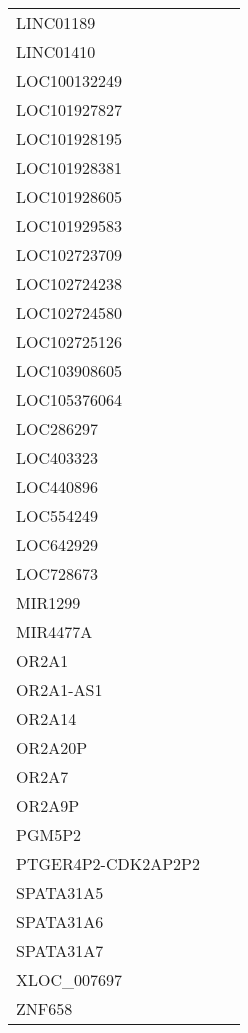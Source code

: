 \begin{tabular}{lcc}
LINC01189          &    &         \\
LINC01410          &    &         \\
LOC100132249       &    &         \\
LOC101927827       &    &         \\
LOC101928195       &    &         \\
LOC101928381       &    &         \\
LOC101928605       &    &         \\
LOC101929583       &    &         \\
LOC102723709       &    &         \\
LOC102724238       &    &         \\
LOC102724580       &    &         \\
LOC102725126       &    &         \\
LOC103908605       &    &         \\
LOC105376064       &    &         \\
LOC286297          &    &         \\
LOC403323          &    &         \\
LOC440896          &    &         \\
LOC554249          &    &         \\
LOC642929          &    &         \\
LOC728673          &    &         \\
MIR1299            &    &         \\
MIR4477A           &    &         \\
OR2A1              &    &         \\
OR2A1-AS1          &    &         \\
OR2A14             &    &         \\
OR2A20P            &    &         \\
OR2A7              &    &         \\
OR2A9P             &    &         \\
PGM5P2             &    &         \\
PTGER4P2-CDK2AP2P2 &    &         \\
SPATA31A5          &    &         \\
SPATA31A6          &    &         \\
SPATA31A7          &    &         \\
XLOC\_007697        &    &         \\
ZNF658             &    &         \\
\bottomrule
\end{tabular}
